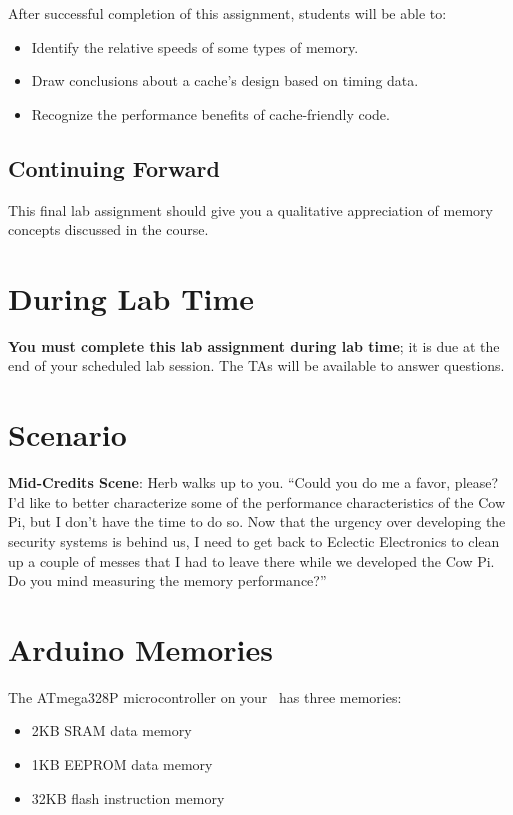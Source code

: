 After successful completion of this assignment, students will be able to:
\begin{itemize}
\item Identify the relative speeds of some types of memory.
\item Draw conclusions about a cache's design based on timing data.
\item Recognize the performance benefits of cache-friendly code.
\end{itemize}

\subsection*{Continuing Forward}

This final lab assignment should give you a qualitative appreciation of memory
concepts discussed in the course.

\section*{During Lab Time}

\textbf{You must complete this lab assignment during lab time}; it is due at the
end of your scheduled lab session. The TAs will be available to answer
questions.

\section{Scenario}

{\large \textbf{Mid-Credits Scene}:} Herb walks up to you. ``Could you do me a
favor, please? I'd like to better characterize some of the performance
characteristics of the Cow Pi, but I don't have the time to do so. Now that the
urgency over developing the security systems is behind us, I need to get back to
Eclectic Electronics to clean up a couple of messes that I had to leave there
while we developed the Cow Pi. Do you mind measuring the memory performance?''

\section{Arduino Memories}

The ATmega328P microcontroller on your \nano\ has three memories:
\begin{itemize}
\item 2KB SRAM data memory
\item 1KB EEPROM data memory
\item 32KB flash instruction memory
\end{itemize}

